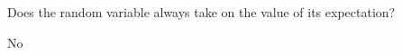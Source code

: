 \question Does the random variable always take on the value of its 
expectation?
\begin{solution}[2cm]
No
\end{solution}